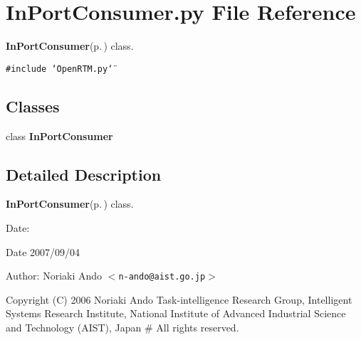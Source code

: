 \section{In\-Port\-Consumer.py File Reference}
\label{InPortConsumer_8py}
{\bf In\-Port\-Consumer}{\rm (p.\,\pageref{classInPortConsumer})} class. 

{\tt \#include \char`\"{}Open\-RTM.py\char`\"{}}\par
\subsection*{Classes}
\begin{CompactItemize}
\item 
class {\bf In\-Port\-Consumer}
\end{CompactItemize}


\subsection{Detailed Description}
{\bf In\-Port\-Consumer}{\rm (p.\,\pageref{classInPortConsumer})} class. 

\begin{Desc}
\item[Date:]\begin{Desc}
\item[Date]2007/09/04\end{Desc}
\end{Desc}
\begin{Desc}
\item[Author:]Noriaki Ando $<${\tt n-ando@aist.go.jp}$>$\end{Desc}
Copyright (C) 2006 Noriaki Ando Task-intelligence Research Group, Intelligent Systems Research Institute, National Institute of Advanced Industrial Science and Technology (AIST), Japan \# All rights reserved.